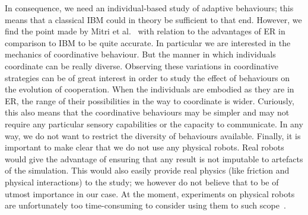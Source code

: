    In consequence, we need an individual-based study of adaptive behaviours; this means that a classical IBM could in theory be sufficient to that end. However, we find the point made by Mitri et al.~\parencite{Mitri2012} with relation to the advantages of ER in comparison to IBM to be quite accurate. In particular we are interested in the mechanics of coordinative behaviour. But the manner in which individuals coordinate can be really diverse. Observing these variations in coordinative strategies can be of great interest in order to study the effect of behaviours on the evolution of cooperation. When the individuals are embodied as they are in ER, the range of their possibilities in the way to coordinate is wider. Curiously, this also means that the coordinative behaviours may be simpler and may not require any particular sensory capabilities or the capacity to communicate. In any way, we do not want to restrict the diversity of behaviours available. Finally, it is important to make clear that we do not use any physical robots. Real robots would give the advantage of ensuring that any result is not imputable to artefacts of the simulation. This would also easily provide real physics (like friction and physical interactions) to the study; we however do not believe that to be of utmost importance in our case. At the moment, experiments on physical robots are unfortunately too time-consuming to consider using them to such scope~\parencite{Mitri2012, Doncieux2015}.



